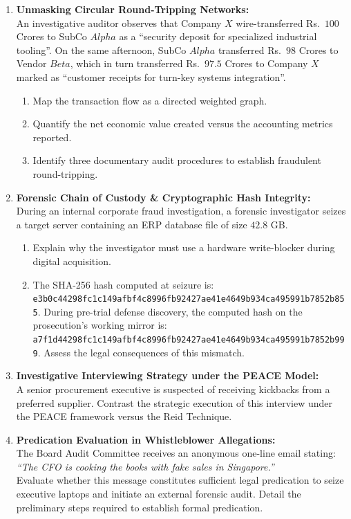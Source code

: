 \begin{enumerate}[label=\textbf{P4.\arabic*}]
    \item \textbf{Unmasking Circular Round-Tripping Networks:}\\
    An investigative auditor observes that Company $X$ wire-transferred Rs.~$100$ Crores to SubCo $Alpha$ as a ``security deposit for specialized industrial tooling''. On the same afternoon, SubCo $Alpha$ transferred Rs.~$98$ Crores to Vendor $Beta$, which in turn transferred Rs.~$97.5$ Crores to Company $X$ marked as ``customer receipts for turn-key systems integration''.
    \begin{enumerate}[label=(\alph*)]
        \item Map the transaction flow as a directed weighted graph.
        \item Quantify the net economic value created versus the accounting metrics reported.
        \item Identify three documentary audit procedures to establish fraudulent round-tripping.
    \end{enumerate}

    \item \textbf{Forensic Chain of Custody \& Cryptographic Hash Integrity:}\\
    During an internal corporate fraud investigation, a forensic investigator seizes a target server containing an ERP database file of size $42.8$ GB.
    \begin{enumerate}[label=(\alph*)]
        \item Explain why the investigator must use a hardware write-blocker during digital acquisition.
        \item The SHA-256 hash computed at seizure is:
        \texttt{e3b0c44298fc1c149afbf4c8996fb92427ae41e4649b934ca495991b7852b855}.
        During pre-trial defense discovery, the computed hash on the prosecution's working mirror is:
        \texttt{a7f1d44298fc1c149afbf4c8996fb92427ae41e4649b934ca495991b7852b999}.
        Assess the legal consequences of this mismatch.
    \end{enumerate}

    \item \textbf{Investigative Interviewing Strategy under the PEACE Model:}\\
    A senior procurement executive is suspected of receiving kickbacks from a preferred supplier. Contrast the strategic execution of this interview under the PEACE framework versus the Reid Technique.

    \item \textbf{Predication Evaluation in Whistleblower Allegations:}\\
    The Board Audit Committee receives an anonymous one-line email stating: \textit{``The CFO is cooking the books with fake sales in Singapore.''}\\
    Evaluate whether this message constitutes sufficient legal predication to seize executive laptops and initiate an external forensic audit. Detail the preliminary steps required to establish formal predication.
\end{enumerate}

